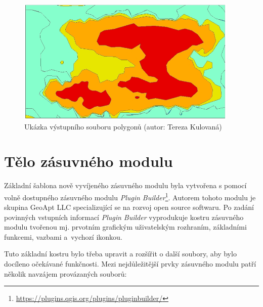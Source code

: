 \begin{enumerate}
\begin{figure}[H]
    \centering
      \includegraphics[width=300pt]{./pictures/vystupni_polygony.jpg}
      \caption[Výstupní polygony]{Ukázka výstupního souboru polygonů (autor: Tereza Kulovaná)}
      \label{fig:polygony}
\end{figure}


\end{enumerate}

\section{Tělo zásuvného modulu}

Základní šablona nově vyvíjeného zásuvného modulu byla vytvořena s
pomocí volně dostupného zásuvného modulu \textit{Plugin
  Builder}\footnote{\url{https://plugins.qgis.org/plugins/pluginbuilder/}}. Autorem
tohoto modulu je skupina GeoApt LLC specializující se na rozvoj open
source softwaru. Po zadání povinných vstupních informací
\textit{Plugin Builder} vyprodukuje kostru zásuvného modulu tvořenou
mj. prvotním grafickým uživatelským rozhraním, základními funkcemi,
vazbami a~vychozí ikonkou.

Tuto základní kostru bylo třeba upravit a rozšířit o další soubory,
aby bylo docíleno očekávané funkčnosti. Mezi nejdůležitější prvky
zásuvného modulu patří několik navzájem provázaných souborů:

